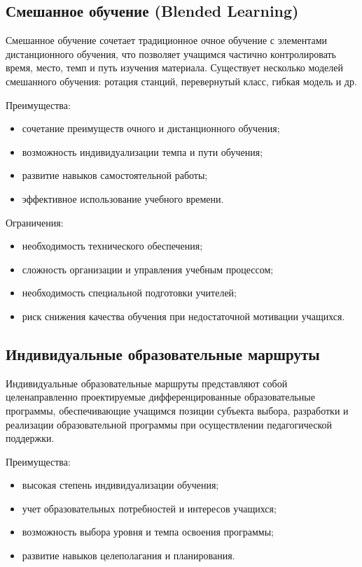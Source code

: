 \documentclass[a4paper,14pt]{extreport}
\begin{document}
\subsection{Смешанное обучение (Blended Learning)}

Смешанное обучение сочетает традиционное очное обучение с элементами дистанционного обучения, что позволяет учащимся частично контролировать время, место, темп и путь изучения материала. Существует несколько моделей смешанного обучения: ротация станций, перевернутый класс, гибкая модель и др.

Преимущества:
\begin{itemize}
    \item сочетание преимуществ очного и дистанционного обучения;
    \item возможность индивидуализации темпа и пути обучения;
    \item развитие навыков самостоятельной работы;
    \item эффективное использование учебного времени.
\end{itemize}

Ограничения:
\begin{itemize}
    \item необходимость технического обеспечения;
    \item сложность организации и управления учебным процессом;
    \item необходимость специальной подготовки учителей;
    \item риск снижения качества обучения при недостаточной мотивации учащихся.
\end{itemize}

\subsection{Индивидуальные образовательные маршруты}

Индивидуальные образовательные маршруты представляют собой целенаправленно проектируемые дифференцированные образовательные программы, обеспечивающие учащимся позиции субъекта выбора, разработки и реализации образовательной программы при осуществлении педагогической поддержки.

Преимущества:
\begin{itemize}
    \item высокая степень индивидуализации обучения;
    \item учет образовательных потребностей и интересов учащихся;
    \item возможность выбора уровня и темпа освоения программы;
    \item развитие навыков целеполагания и планирования.
\end{itemize}
\end{document}
